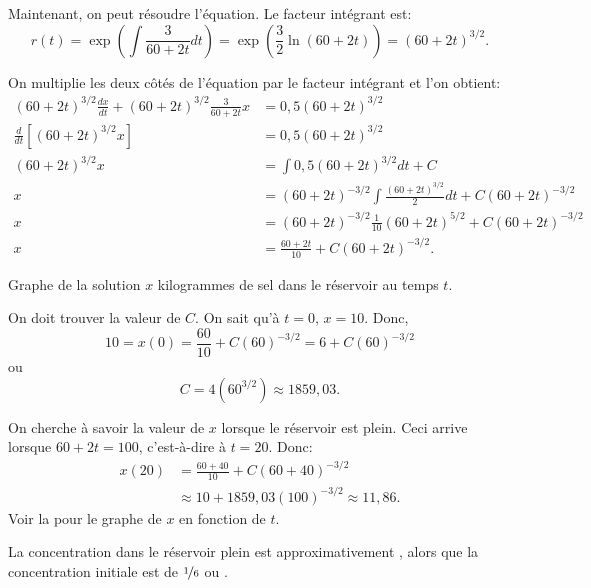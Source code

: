 \begin{example}
	Maintenant, on peut résoudre l'équation.  Le facteur intégrant est:
	\begin{equation*}
		r(t) = \exp \left( \int \frac{3}{60+2t} dt  \right)
		= 	\exp \left( \frac{3}{2} \ln (60+2t) \right)
		= 	{(60+2t)}^{3/2} .
	\end{equation*}

	On multiplie les deux côtés de l'équation par le facteur intégrant et l'on obtient:
	\begin{align*}
	{(60+2t)}^{3/2} \frac{dx}{dt} + {(60+2t)}^{3/2} \frac{3}{60+2t} x
		& = 	0,5{(60+2t)}^{3/2} \\
	\frac{d}{dt}\left[{(60+2t)}^{3/2} x \right]
		& = 0,5{(60+2t)}^{3/2} \\
	{(60+2t)}^{3/2} x
		& = \int  0,5{(60+2t)}^{3/2} dt +C \\
	 x	& = 	{(60+2t)}^{-3/2} \int  \frac{{(60+2t)}^{3/2}}{2}dt
					+C{(60+2t)}^{-3/2} \\
	 x	& =	{(60+2t)}^{-3/2}\frac{1}{10}{(60+2t)}^{5/2}	+C{(60+2t)}^{-3/2} \\
	 x	& = \frac{60+2t}{10}+C{(60+2t)}^{-3/2} .
	\end{align*}

	\begin{mywrapfig}{3.25in}
		\capstart{}
		\caption{Graphe de la solution $x$ kilogrammes de sel dans le réservoir au temps $t$.\label{linear-salt-graph:fig}}
	\end{mywrapfig}
	On doit trouver la valeur de $C$.  On sait qu'à $t=0$, $x=10$.
	Donc,
	\begin{equation*}
		10 = x(0) 	= 	\frac{60}{10}+C{(60)}^{-3/2} =6 +C{(60)}^{-3/2}
	\end{equation*}
	ou
	\begin{equation*}
		C=4 ({60}^{3/2}) \approx 1859,03 .
	\end{equation*}

	On cherche à savoir la valeur de $x$ lorsque le réservoir est plein.  Ceci arrive lorsque $60+2t = 100$, c'est-à-dire à  $t=20$.  Donc:
	\begin{equation*}
	\begin{split}
		x(20) & = 	\frac{60+40}{10}+C{(60+40)}^{-3/2}	\\
	 		& \approx	10 +1859,03 {(100)}^{-3/2} \approx 11,86 .
	\end{split}
	\end{equation*}
	Voir la  pour le graphe de $x$ en fonction de $t$.

	La concentration dans le réservoir plein est approximativement ,
	alors que la concentration initiale est de $\nicefrac{1}{6}$ ou .
\end{example}

